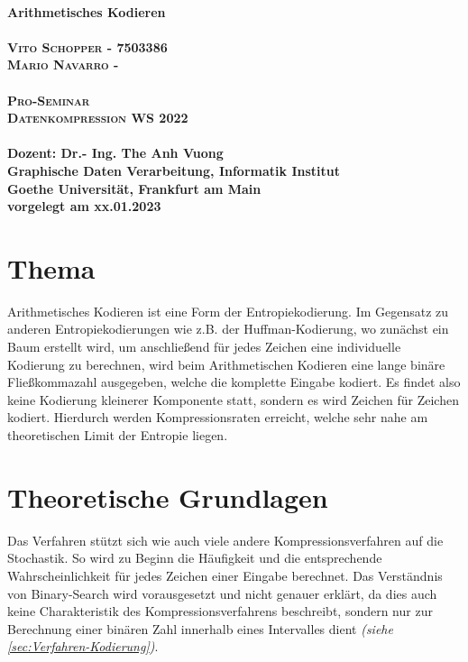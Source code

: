 \documentclass[a4paper]{article}
\theoremstyle{definition}
\theoremstyle{remark}
\begin{document}
	\begin{titlepage}
	
	\begin{center}

		\huge \textbf{\textsf{
		\\Arithmetisches Kodieren}} \\
		\LARGE\textbf{\textsc{\\
		Vito Schopper - 7503386
		\\
		Mario Navarro - }}\\ 
		\vspace{2cm}
		\LARGE\textbf{\textsc{\\Pro-Seminar
		\\ Datenkompression WS 2022}}\\ 
		\vspace{2.5cm}
		\large \textbf{
		\\
				Dozent: {Dr.- Ing. The Anh Vuong} \\
Graphische Daten Verarbeitung, Informatik Institut
\\
Goethe Universität, Frankfurt am Main
\\
vorgelegt am xx.01.2023 %
}
	\end{center}
\end{titlepage}
\tableofcontents\newpage
	
\section{Thema}
\label{sec:Thema}
Arithmetisches Kodieren ist eine Form der Entropiekodierung. Im Gegensatz zu anderen Entropiekodierungen wie z.B. der Huffman-Kodierung, wo zunächst ein Baum erstellt wird, um anschließend für jedes Zeichen eine individuelle Kodierung zu berechnen, wird beim Arithmetischen Kodieren eine lange binäre Fließkommazahl ausgegeben, welche die komplette Eingabe kodiert. Es findet also keine Kodierung kleinerer Komponente statt, sondern es wird Zeichen für Zeichen kodiert. Hierdurch werden Kompressionsraten erreicht, welche sehr nahe am theoretischen Limit der Entropie liegen.\cite{WIKI}

		\section{Theoretische Grundlagen}
Das Verfahren stützt sich wie auch viele andere Kompressionsverfahren auf die Stochastik. So wird zu Beginn die Häufigkeit und die entsprechende Wahrscheinlichkeit für jedes Zeichen einer Eingabe berechnet. Das Verständnis von Binary-Search wird vorausgesetzt und nicht genauer erklärt, da dies auch keine Charakteristik des Kompressionsverfahrens beschreibt, sondern nur zur Berechnung einer binären Zahl innerhalb eines Intervalles dient \textit{(siehe \ref{sec:Verfahren-Kodierung})}.
\end{document}
